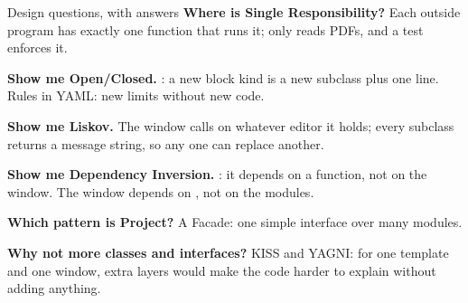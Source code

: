 \begin{cheat}{Design questions, with answers}
\textbf{Where is Single Responsibility?} Each outside program has exactly one function that runs it;  only reads PDFs, and a test enforces it.\par
\textbf{Show me Open/Closed.} : a new block kind is a new subclass plus one line. Rules in YAML: new limits without new code.\par
\textbf{Show me Liskov.} The window calls  on whatever editor it holds; every subclass returns a message string, so any one can replace another.\par
\textbf{Show me Dependency Inversion.} : it depends on a function, not on the window. The window depends on , not on the modules.\par
\textbf{Which pattern is Project?} A Facade: one simple interface over many modules.\par
\textbf{Why not more classes and interfaces?} KISS and YAGNI: for one template and one window, extra layers would make the code harder to explain without adding anything.
\end{cheat}
